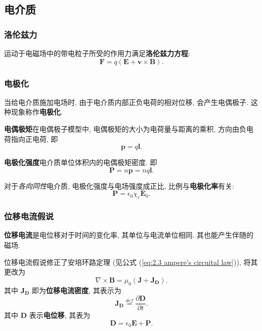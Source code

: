 \subsection{电介质}
\subsubsection{洛伦兹力}
运动于电磁场中的带电粒子所受的作用力满足\textbf{洛伦兹力方程}:
\begin{equation}
    \bm{F}=q(\bm{E}+\bm{v}\times\bm{B}).
\end{equation}

\subsubsection{电极化}
当给电介质施加电场时, 由于电介质内部正负电荷的相对位移, 会产生电偶极子. 这种现象称作\textbf{电极化}.

\textbf{电偶极矩}\quad 在电偶极子模型中, 电偶极矩的大小为电荷量与距离的乘积, 方向由负电荷指向正电荷, 即
\begin{equation}
    \bm{p}=q\bm{l}.
\end{equation}

\textbf{电极化强度}\quad 电介质单位体积内的电偶极矩密度. 即
\begin{equation}
    \bm{P}=n\bm{p}=nq\bm{l}.
\end{equation}

对于\textit{各向同性}电介质, 电极化强度与电场强度成正比, 比例与\textbf{电极化率}有关:
\begin{equation}
    \bm{P}=\epsilon_0\chi_e\bm{E}_0.
\end{equation}

\subsubsection{位移电流假说}
\textbf{位移电流}是电位移对于时间的变化率, 其单位与电流单位相同. 其也能产生伴随的磁场.

位移电流假说修正了安培环路定理 (见公式 (\ref{eq:2.3 ampere's circuital law})), 将其更改为
\begin{equation}
    \nabla\times\bm{B}=\mu_0(\bm{J}+\bm{J_D}).
\end{equation}
其中 $\bm{J_D}$ 即为\textbf{位移电流密度}, 其表示为
\begin{equation}
    \bm{J_D}\stackrel{def}{=}\frac{\partial\bm{D}}{\partial t}.
\end{equation}
其中 $\bm{D}$ 表示\textbf{电位移}, 其表为
\begin{equation}
    \bm{D}=\epsilon_0\bm{E}+\bm{P}.
\end{equation}

